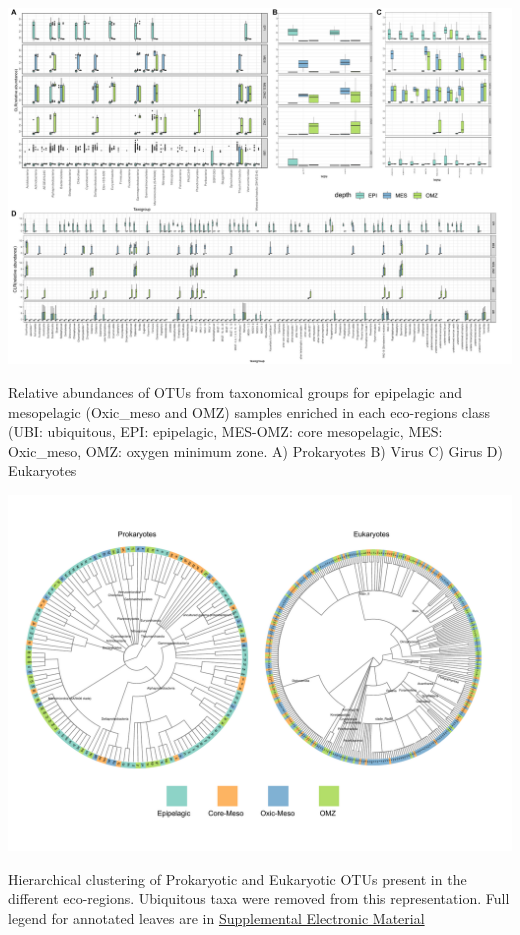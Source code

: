 \documentclass[fleqn,10pt]{wlscirep}
\begin{document}
\begin{suppfigure}[ht]
    \centering
    \includegraphics[scale=0.74,angle=270,origin=c]{images/box_plots_assign.pdf}
    \caption{Relative abundances of OTUs from taxonomical groups for epipelagic and mesopelagic (Oxic\_meso and OMZ) samples enriched in each eco-regions class (UBI: ubiquitous, EPI: epipelagic, MES-OMZ: core mesopelagic, MES: Oxic\_meso, OMZ: oxygen minimum zone. A) Prokaryotes B) Virus C) Girus D) Eukaryotes}
    \label{fig:box_plot_assig}
\end{suppfigure}

\begin{suppfigure}[ht]
    \centering
    \includegraphics[scale=0.6, origin=c]{images/Trees_OTU_sup_v2.pdf}
    \caption{Hierarchical clustering of Prokaryotic and Eukaryotic OTUs present in the different eco-regions. Ubiquitous taxa were removed from this representation. Full legend for annotated leaves are in \href{https://docs.google.com/spreadsheets/d/1N1xzjx8YBxD9Trgy7jHuE1G6fmDtgE7f3KkcxjNAJyc/edit?usp=sharing}{Supplemental Electronic Material}}
    \label{fig:tax_trees_sup}
\end{suppfigure}
\clearpage
\end{document}
